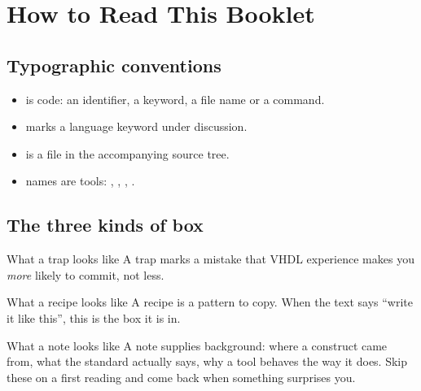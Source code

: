 \chapter*{How to Read This Booklet}

\section*{Typographic conventions}

\begin{itemize}
  \item {} is code: an identifier, a keyword, a file name
        or a command.
  \item {} marks a language keyword under
        discussion.
  \item {} is a file in the accompanying source
        tree.
  \item {} names are tools: , ,
        , .
\end{itemize}

\section*{The three kinds of box}

\begin{gotcha}{What a trap looks like}
A trap marks a mistake that VHDL experience makes you \emph{more} likely to
commit, not less.
\end{gotcha}

\begin{tipbox}{What a recipe looks like}
A recipe is a pattern to copy. When the text says ``write it like this'',
this is the box it is in.
\end{tipbox}

\begin{notebox}{What a note looks like}
A note supplies background: where a construct came from, what the standard
actually says, why a tool behaves the way it does. Skip these on a first
reading and come back when something surprises you.
\end{notebox}

